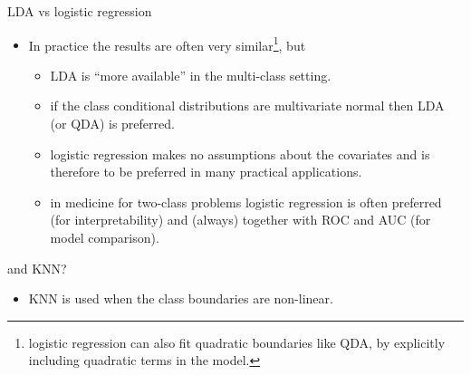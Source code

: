 \documentclass[10pt,ignorenonframetext,]{beamer}
\providecommand{\tightlist}{%
  \setlength{\itemsep}{0pt}\setlength{\parskip}{0pt}}
\begin{document}
\begin{frame}

\begin{block}{LDA vs logistic regression}

\vspace{2mm}

\begin{itemize}
\tightlist
\item
  In practice the results are often very
  similar\footnote{logistic regression can also fit quadratic boundaries
  like QDA, by explicitly including quadratic terms in the model.},
  but\\
  \vspace{2mm}

  \begin{itemize}
  \tightlist
  \item
    LDA is ``more available'' in the multi-class setting.
  \item
    if the class conditional distributions are multivariate normal then
    LDA (or QDA) is preferred.
  \item
    logistic regression makes no assumptions about the covariates and is
    therefore to be preferred in many practical applications.
  \item
    in medicine for two-class problems logistic regression is often
    preferred (for interpretability) and (always) together with ROC and
    AUC (for model comparison).
  \end{itemize}
\end{itemize}

\vspace{2mm}

\end{block}

\begin{block}{and KNN?}

\vspace{2mm}

\begin{itemize}
\tightlist
\item
  KNN is used when the class boundaries are non-linear.
\end{itemize}

\end{block}

\end{frame}
\end{document}
